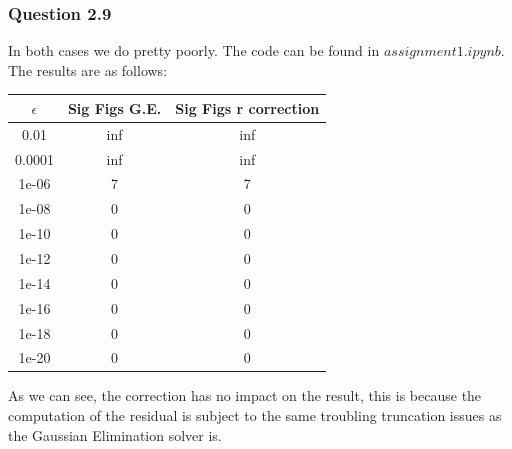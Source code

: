 \documentclass{article}
\begin{document}
\subsubsection{Question 2.9}
In both cases we do pretty poorly. The code can be found in
$assignment1.ipynb$. The results are as follows:

\begin{center}

\begin{tabular}{|c|c|c|}
\hline
$\epsilon$ & Sig Figs G.E. & Sig Figs r correction \\
\hline
0.01 & inf & inf\\
0.0001 & inf & inf\\
1e-06 & 7 & 7\\
1e-08 & 0 & 0\\
1e-10 & 0 & 0\\
1e-12 & 0 & 0\\
1e-14 & 0 & 0\\
1e-16 & 0 & 0\\
1e-18 & 0 & 0\\
1e-20 & 0 & 0\\
\hline


\end{tabular}

\end{center}

As we can see, the correction has no impact on the result, this is
because the computation of the residual is subject to the same
troubling truncation issues as the Gaussian Elimination solver is.
\end{document}
